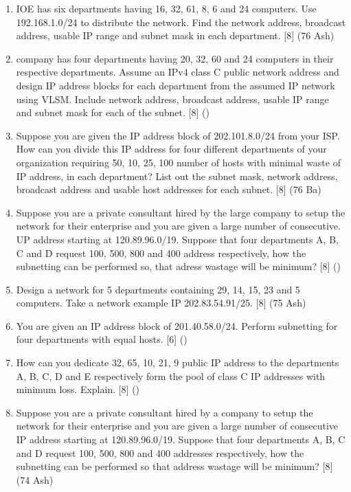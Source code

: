 \documentclass[12pt]{article}
\begin{document}
\begin{enumerate}
			\item IOE has six departments having 16, 32, 61, 8, 6 and 24 computers. Use 192.168.1.0/24 to distribute the network. Find the network address, broadcast address, usable IP range and subnet mask in each department. \hfill [8] (76 Ash)

			\item  company has four departments having 20, 32, 60 and 24 computers in their respective departments. Assume an IPv4 class C public network address and design IP address blocks for each department from the assumed IP network using VLSM. Include network address, broadcast address, usable IP range and subnet mask for each of the subnet. \hfill [8] ()

			\item Suppose you are given the IP address block of 202.101.8.0/24 from your ISP. How can you divide this IP address for four different departments of your organization requiring 50, 10, 25, 100 number of hosts with minimal waste of IP address, in each department? List out the subnet mask, network address, broadcast address and usable host addresses for each subnet. \hfill [8] (76 Ba)

			\item Suppose you are a private consultant hired by the large company to setup the network for their enterprise and you are given a large number of consecutive. UP address starting at 120.89.96.0/19. Suppose that four departments A, B, C and D request 100, 500, 800 and 400 address respectively, how the subnetting can be performed so, that adress wastage will be minimum? \hfill [8] ()

			\item Design a network for 5 departments containing 29, 14, 15, 23 and 5 computers. Take a network example IP 202.83.54.91/25. \hfill [8] (75 Ash)

			\item You are given an IP address block of 201.40.58.0/24. Perform subnetting for four departments with equal hosts. \hfill [6] ()

			\item How can you dedicate 32, 65, 10, 21, 9 public IP address to the departments A, B, C, D and E respectively form the pool of class C IP addresses with minimum loss. Explain. \hfill [8] ()

			\item Suppose you are a private consultant hired by a company to setup the network for their enterprise and you are given a large number of consecutive IP address starting at 120.89.96.0/19. Suppose that four departments A, B, C and D request 100, 500, 800 and 400 addresses respectively, how the subnetting can be performed so that address wastage will be minimum? \hfill [8] (74 Ash)


\end{enumerate}
\end{document}
